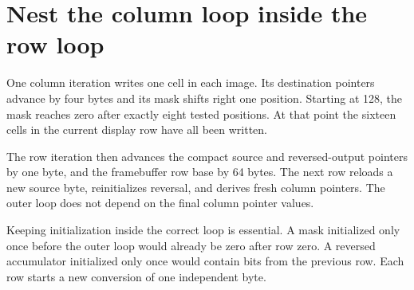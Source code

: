 \section{Nest the column loop inside the row
  loop}\label{003-eight-byte-sprite-p08-nest-the-column-loop-inside-the-row-loop}

One column iteration writes one cell in each image. Its destination
pointers advance by four bytes and its mask shifts right one position.
Starting at 128, the mask reaches zero after exactly eight tested
positions. At that point the sixteen cells in the current display row
have all been written.

The row iteration then advances the compact source and reversed-output
pointers by one byte, and the framebuffer row base by 64 bytes. The next
row reloads a new source byte, reinitializes reversal, and derives fresh
column pointers. The outer loop does not depend on the final column
pointer values.

Keeping initialization inside the correct loop is essential. A mask
initialized only once before the outer loop would already be zero after
row zero. A reversed accumulator initialized only once would contain
bits from the previous row. Each row starts a new conversion of one
independent byte.
